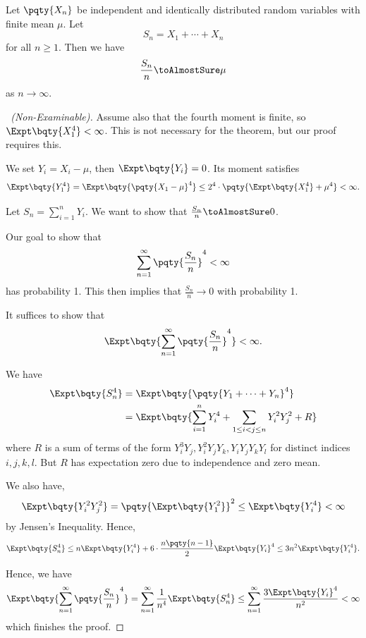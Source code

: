 \begin{theorem}
    \label{thm:strong-law-of-large-numbers}%
    Let \(\pqty{X_n}\) be independent and identically distributed random variables with finite mean \(\mu\). Let
    \[
        S_n = X_1 + \cdots + X_n
    \]
    for all \(n \geq 1\). Then we have
    \[
        \frac{S_n}{n} \toAlmostSure \mu
    \]
    as \(n \to \infty\).
\end{theorem}

\begin{proof}[\proofname\ (Non-Examinable)]
    Assume also that the fourth moment is finite, so \(\Expt\bqty{X_1^4} < \infty\). This is not necessary for the theorem, but our proof requires this.

    We set \(Y_i = X_i - \mu\), then \(\Expt\bqty{Y_i} = 0\). Its moment satisfies
    \[
        \Expt\bqty{Y_1^4} = \Expt\bqty{\pqty{X_1 - \mu}^4} \leq 2^4 \cdot \pqty{\Expt\bqty{X_1^4} + \mu^4} < \infty.
    \]

    Let \(S_n = \sum_{i = 1}^{n} Y_i\). We want to show that \(\frac{S_n}{n} \toAlmostSure 0\).

    Our goal to show that
    \[
        \sum_{n = 1}^{\infty} \pqty{\frac{S_n}{n}}^4 < \infty
    \]
    has probability 1. This then implies that \(\frac{S_n}{n} \to 0\) with probability 1.

    It suffices to show that
    \[
        \Expt\bqty{\sum_{n = 1}^{\infty} \pqty{\frac{S_n}{n}}^4} < \infty.
    \]

    We have
    \begin{align*}
        \Expt\bqty{S_n^4} &= \Expt\bqty{\pqty{Y_1 + \cdots + Y_n}^4} \\
        &= \Expt\bqty{\sum_{i = 1}^{n} Y_i^4 + \sum_{1 \leq i < j \leq n} Y_i^2 Y_j^2 + R}
    \end{align*}
    where \(R\) is a sum of terms of the form \(Y_i^3 Y_j, Y_i^2 Y_j Y_k, Y_i Y_j Y_k Y_l\) for distinct indices \(i, j, k, l\). But \(R\) has expectation zero due to independence and zero mean.

    We also have,
    \[
        \Expt\bqty{Y_i^2 Y_j^2} = \pqty{\Expt\bqty{Y_1^2}}^2 \leq \Expt\bqty{Y_i^4} < \infty
    \]
    by Jensen's Inequality. Hence,
    \[
        \Expt\bqty{S_n^4} \leq n \Expt\bqty{Y_i^4} + 6 \cdot \frac{n \pqty{n - 1}}{2} \Expt\bqty{Y_i}^4 \leq 3n^2 \Expt\bqty{Y_i^4}.
    \]

    Hence, we have
    \[
        \Expt\bqty{\sum_{n = 1}^{\infty} \pqty{\frac{S_n}{n}}^4} = \sum_{n = 1}^{\infty} \frac{1}{n^4} \Expt\bqty{S_n^4} \leq \sum_{n = 1}^{\infty} \frac{3 \Expt\bqty{Y_i}^4}{n^2} < \infty
    \]
    which finishes the proof.
\end{proof}

